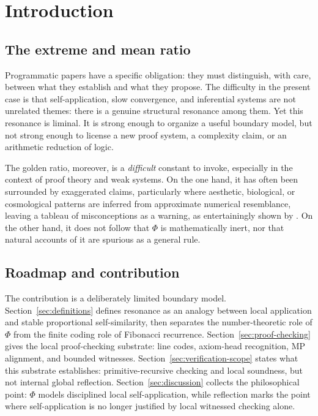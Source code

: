 \documentclass[letterpaper,10pt]{article}
\theoremstyle{upright}
\theoremstyle{upright}
\begin{document}
\section{Introduction}\label{sec:introduction}

\subsection{The extreme and mean ratio}\label{subsec:extreme-mean-ratio}

Programmatic papers have a specific obligation: they must distinguish, with care, between what they establish and what they propose. The difficulty in the present case is that self-application, slow convergence, and inferential systems are not unrelated themes: there is a genuine structural resonance among them. Yet this resonance is liminal. It is strong enough to organize a useful boundary model, but not strong enough to license a new proof system, a complexity claim, or an arithmetic reduction of logic.

The golden ratio, moreover, is a \emph{difficult} constant to invoke, especially in the context of proof theory and weak systems. On the one hand, it has often been surrounded by exaggerated claims, particularly where aesthetic, biological, or cosmological patterns are inferred from approximate numerical resemblance, leaving a tableau of misconceptions as a warning, as entertainingly shown by \citet{markowsky92}. On the other hand, it does not follow that $\Phi$ is mathematically inert, nor that natural accounts of it are spurious as a general rule.

\subsection{Roadmap and contribution}\label{subsec:roadmap}

The contribution is a deliberately limited boundary model. Section~\ref{sec:definitions} defines resonance as an analogy between local application and stable proportional self-similarity, then separates the number-theoretic role of $\Phi$ from the finite coding role of Fibonacci recurrence. Section~\ref{sec:proof-checking} gives the local proof-checking substrate: line codes, axiom-head recognition, \textsc{MP} alignment, and bounded witnesses. Section~\ref{sec:verification-scope} states what this substrate establishes: primitive-recursive checking and local soundness, but not internal global reflection. Section~\ref{sec:discussion} collects the philosophical point: $\Phi$ models disciplined local self-application, while reflection marks the point where self-application is no longer justified by local witnessed checking alone.
\end{document}
